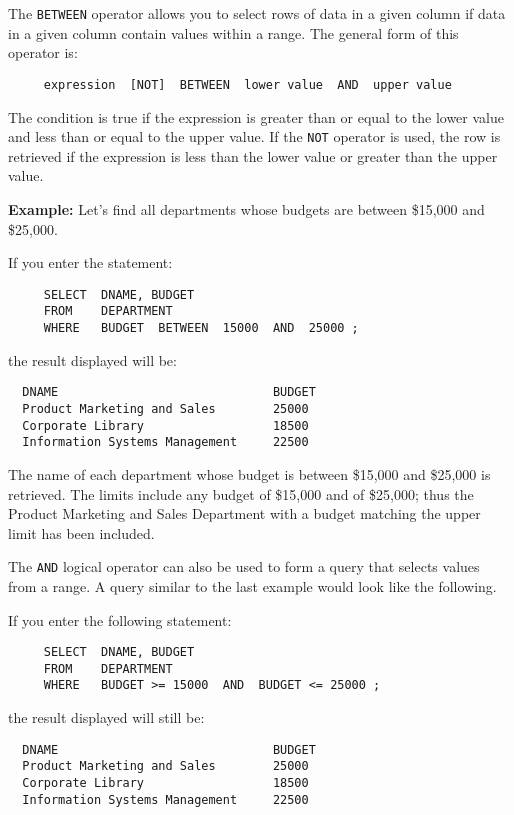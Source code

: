 The {\tt BETWEEN} operator allows you to select rows of data in a given
column if data in a given column contain values within a range.  The
general form of this operator is:
\begin{verbatim}
     expression  [NOT]  BETWEEN  lower value  AND  upper value
\end{verbatim}

The condition is true if the expression is greater than or equal to
the lower value and less than or equal to the upper value.  If the {\tt NOT}
operator is used, the row is retrieved if the expression is less than
the lower value or greater than the upper value.

{\bf Example:}
Let's find all departments whose budgets are between \$15,000 and
\$25,000.

If you enter the statement:
\begin{verbatim}
     SELECT  DNAME, BUDGET
     FROM    DEPARTMENT
     WHERE   BUDGET  BETWEEN  15000  AND  25000 ;
\end{verbatim}
the result displayed will be:

\begin{screen}
\begin{verbatim}
  DNAME                              BUDGET
  Product Marketing and Sales        25000
  Corporate Library                  18500
  Information Systems Management     22500
\end{verbatim}
\end{screen}

The name of each department whose budget is between \$15,000 and
\$25,000 is retrieved.  The limits include any budget of \$15,000 and
of \$25,000; thus the Product Marketing and Sales Department with a
budget matching the upper limit has been included.

The {\tt AND} logical operator can also be used to form a query that selects
values from a range.  A query similar to the last example would look
like the following.

If you enter the following statement:
\begin{verbatim}
     SELECT  DNAME, BUDGET
     FROM    DEPARTMENT
     WHERE   BUDGET >= 15000  AND  BUDGET <= 25000 ;
\end{verbatim}
the result displayed will still be:

\begin{screen}
\begin{verbatim}
  DNAME                              BUDGET
  Product Marketing and Sales        25000
  Corporate Library                  18500
  Information Systems Management     22500
\end{verbatim}
\end{screen}

